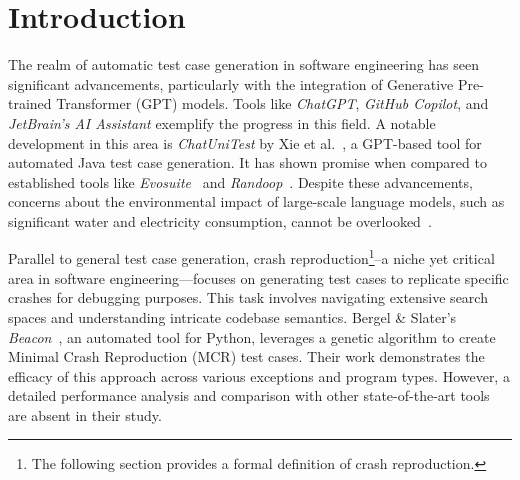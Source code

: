\section{Introduction}
\label{sec:beacon:intro}

    The realm of automatic test case generation in software engineering has seen significant advancements, particularly 
    with the integration of Generative Pre-trained Transformer (GPT) models. Tools like \textit{ChatGPT}, 
    \textit{GitHub Copilot}, and \textit{JetBrain's AI Assistant} exemplify the progress in this field. A notable 
    development in this area is \textit{ChatUniTest} by Xie et al.~\autocite{xieChatUniTestChatGPTbasedAutomated2023}, 
    a GPT-based tool for automated Java test case generation. It has shown promise when compared to established 
    tools like \textit{Evosuite}~\autocite{fraserEvoSuiteAutomaticTest2011} and 
    \textit{Randoop}~\autocite{pachecoRandoopFeedbackdirectedRandom2007}. Despite these advancements, concerns about 
    the environmental impact of large-scale language models, such as significant water and electricity consumption, 
    cannot be overlooked~\autocite{georgeEnvironmentalImpactAI2023, UWResearcherDiscusses}.

    Parallel to general test case generation, crash reproduction\footnote{
        The following section provides a formal definition of crash reproduction.
    }--a niche yet critical area in software engineering—focuses on generating test cases to replicate specific crashes 
    for debugging purposes. This task involves navigating extensive search spaces and understanding intricate codebase 
    semantics. Bergel \& Slater's \textit{Beacon}~\autocite{bergelBeaconAutomatedTest2021}, an automated tool for 
    Python, leverages a genetic algorithm to create Minimal Crash Reproduction (MCR) test cases. 
    Their work demonstrates the efficacy of this approach across various exceptions and program types. However, a 
    detailed performance analysis and comparison with other state-of-the-art tools are absent in their study.

